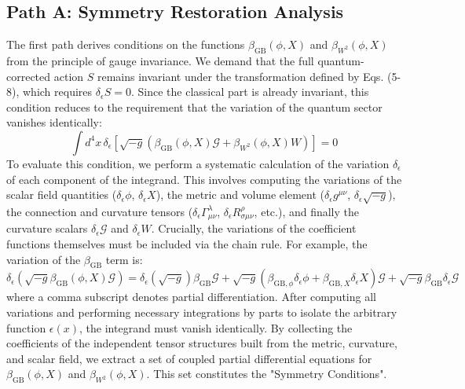 \documentclass[twocolumn]{aastex631}
\begin{document}
\subsection{Path A: Symmetry Restoration Analysis}

The first path derives conditions on the functions $\beta_{\text{GB}}(\phi, X)$ and $\beta_{W^2}(\phi, X)$ from the principle of gauge invariance. We demand that the full quantum-corrected action $S$ remains invariant under the transformation defined by Eqs. (5-8), which requires $\delta_\epsilon S = 0$. Since the classical part is already invariant, this condition reduces to the requirement that the variation of the quantum sector vanishes identically:
\begin{equation}
\int d^4x \, \delta_\epsilon \left[ \sqrt{-g} \left( \beta_{\text{GB}}(\phi, X) \mathcal{G} + \beta_{W^2}(\phi, X) W \right) \right] = 0
\end{equation}
To evaluate this condition, we perform a systematic calculation of the variation $\delta_\epsilon$ of each component of the integrand. This involves computing the variations of the scalar field quantities ($\delta_\epsilon \phi$, $\delta_\epsilon X$), the metric and volume element ($\delta_\epsilon g^{\mu\nu}$, $\delta_\epsilon \sqrt{-g}$), the connection and curvature tensors ($\delta_\epsilon \Gamma^\lambda_{\mu\nu}$, $\delta_\epsilon R^\rho_{\sigma\mu\nu}$, etc.), and finally the curvature scalars $\delta_\epsilon \mathcal{G}$ and $\delta_\epsilon W$. Crucially, the variations of the coefficient functions themselves must be included via the chain rule. For example, the variation of the $\beta_{\text{GB}}$ term is:
\begin{equation}
\delta_\epsilon(\sqrt{-g}\beta_{\text{GB}}(\phi, X)\mathcal{G}) = \delta_\epsilon(\sqrt{-g})\beta_{\text{GB}}\mathcal{G} + \sqrt{-g}(\beta_{\text{GB},\phi}\delta_\epsilon\phi + \beta_{\text{GB},X}\delta_\epsilon X)\mathcal{G} + \sqrt{-g}\beta_{\text{GB}}\delta_\epsilon\mathcal{G}
\end{equation}
where a comma subscript denotes partial differentiation. After computing all variations and performing necessary integrations by parts to isolate the arbitrary function $\epsilon(x)$, the integrand must vanish identically. By collecting the coefficients of the independent tensor structures built from the metric, curvature, and scalar field, we extract a set of coupled partial differential equations for $\beta_{\text{GB}}(\phi, X)$ and $\beta_{W^2}(\phi, X)$. This set constitutes the "Symmetry Conditions".
\end{document}
